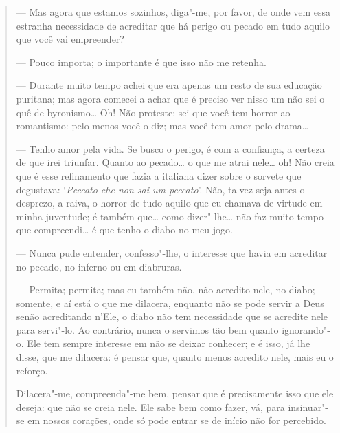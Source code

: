 \begin{quote}
--- Mas agora que estamos sozinhos, diga"-me, por favor, de onde vem essa
estranha necessidade de acreditar que há perigo ou pecado em tudo aquilo
que você vai empreender?

--- Pouco importa; o importante é que isso não me retenha.

--- Durante muito tempo achei que era apenas um resto de sua educação
puritana; mas agora comecei a achar que é preciso ver nisso um não sei o
quê de byronismo\ldots{} Oh! Não proteste: sei que você tem horror ao
romantismo: pelo menos você o diz; mas você tem amor pelo drama\ldots{}

--- Tenho amor pela vida. Se busco o perigo, é com a confiança, a certeza
de que irei triunfar. Quanto ao pecado\ldots{} o que me atrai nele\ldots{} oh!
Não creia que é esse refinamento que fazia a italiana dizer sobre o
sorvete que degustava: `\emph{Peccato che non sai um peccato}'. Não,
talvez seja antes o desprezo, a raiva, o horror de tudo aquilo que eu
chamava de virtude em minha juventude; é também que\ldots{} como dizer"-lhe\ldots{} não faz muito tempo que compreendi\ldots{} é que tenho o diabo no meu
jogo.

--- Nunca pude entender, confesso"-lhe, o interesse que havia em acreditar
no pecado, no inferno ou em diabruras.

--- Permita; permita; mas eu também não, não acredito nele, no diabo;
somente, e aí está o que me dilacera, enquanto não se pode servir a Deus
senão acreditando n'Ele, o diabo não tem necessidade que se acredite
nele para servi"-lo. Ao contrário, nunca o servimos tão bem quanto
ignorando"-o. Ele tem sempre interesse em não se deixar conhecer; e é
isso, já lhe disse, que me dilacera: é pensar que, quanto menos acredito
nele, mais eu o reforço.

Dilacera"-me, compreenda"-me bem, pensar que é precisamente isso que ele
deseja: que não se creia nele. Ele sabe bem como fazer, vá, para
insinuar"-se em nossos corações, onde só pode entrar se de início não for
percebido.


\end{quote}
